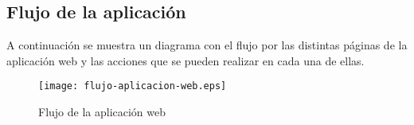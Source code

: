 \subsection{Flujo de la aplicación}

    A continuación se muestra un diagrama con el flujo por las distintas páginas de la aplicación web y las acciones que se pueden realizar en cada una de ellas.

    \begin{figure}[H]
        \centering
        \texttt{[image: flujo-aplicacion-web.eps]}
        \caption{Flujo de la aplicación web}\label{fig:flujo-aplicacion-web}
    \end{figure}
